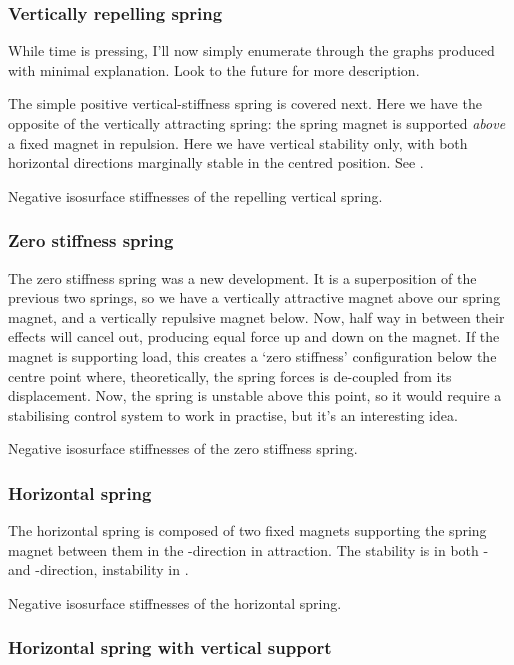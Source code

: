 \subsubsection{Vertically repelling spring}

While time is pressing, I'll now simply enumerate through the graphs produced
with minimal explanation. Look to the future for more description.

The simple positive vertical-stiffness spring is covered next. Here we have
the opposite of the vertically attracting spring: the spring magnet is
supported \emph{above} a fixed magnet in repulsion. Here we have vertical
stability only, with both horizontal directions marginally stable in the
centred position. See .

  {Negative isosurface stiffnesses of the repelling vertical spring.}

\subsubsection{Zero stiffness spring}

The zero stiffness spring was a new development. It is a superposition of the
previous two springs, so we have a vertically attractive magnet above our
spring magnet, and a vertically repulsive magnet below. Now, half way in
between their effects will cancel out, producing equal force up and down on
the magnet. If the magnet is supporting load, this creates a `zero stiffness'
configuration below the centre point where, theoretically, the spring forces
is de-coupled from its displacement. Now, the spring is unstable above this
point, so it would require a stabilising control system to work in practise,
but it's an interesting idea.

  {Negative isosurface stiffnesses of the zero stiffness spring.}

\subsubsection{Horizontal spring}

The horizontal spring is composed of two fixed magnets supporting the spring
magnet between them in the \x-direction in attraction. The stability is in
both \y- and \z-direction, instability in \x.

  {Negative isosurface stiffnesses of the horizontal spring.}

\subsubsection{Horizontal spring with vertical support}

